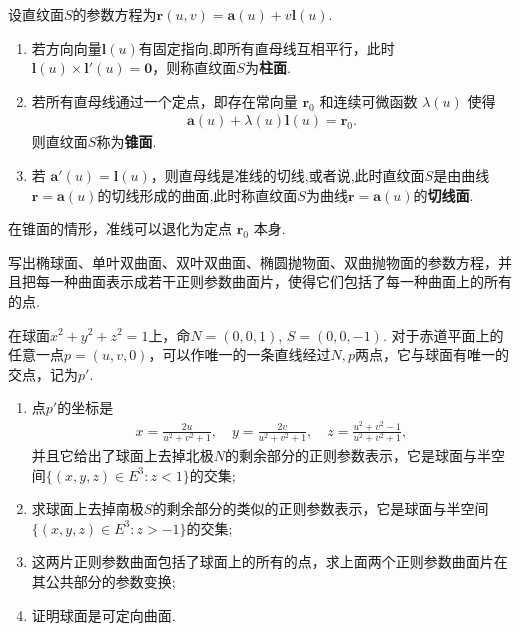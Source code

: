 \documentclass[../../main.tex]{subfiles}%
\begin{document}
\begin{definition}
设直纹面$S$的参数方程为$\bm{r}(u,v)=\bm{a}(u)+v\bm{l}(u)$.
\begin{enumerate}[(1)]
\item 若方向向量$\bm{l}(u)$有固定指向,即所有直母线互相平行，此时$\bm{l}(u)\times\bm{l}'(u)=\bm{0}$，则称直纹面$S$为\textbf{柱面}.

\item 若所有直母线通过一个定点，即存在常向量 $\bm{r}_0$ 和连续可微函数 $\lambda(u)$ 使得
\begin{align*}
\bm{a}(u)+\lambda(u)\bm{l}(u)=\bm{r}_0.
\end{align*}
则直纹面$S$称为\textbf{锥面}.

\item 若 $\bm{a}'(u)=\bm{l}(u)$，则直母线是准线的切线,或者说,此时直纹面$S$是由曲线$\bm{r}=\bm{a}(u)$的切线形成的曲面,此时称直纹面$S$为曲线$\bm{r}=\bm{a}(u)$的\textbf{切线面}.
\end{enumerate}
\end{definition}
\begin{remark}
在锥面的情形，准线可以退化为定点 $\bm{r}_0$ 本身.
\end{remark}

\begin{example}
写出椭球面、单叶双曲面、双叶双曲面、椭圆抛物面、双曲抛物面的参数方程，并且把每一种曲面表示成若干正则参数曲面片，使得它们包括了每一种曲面上的所有的点.
\end{example}
\begin{solution}


\end{solution}

\begin{example}
在球面$x^2 + y^2 + z^2 = 1$上，命$N = (0,0,1)$, $S = (0,0,-1)$. 对于赤道平面上的任意一点$p = (u,v,0)$，可以作唯一的一条直线经过$N, p$两点，它与球面有唯一的交点，记为$p'$.
\begin{enumerate}[(1)]
\item 点$p'$的坐标是
\begin{align*}
x = \frac{2u}{u^2 + v^2 + 1}, \quad y = \frac{2v}{u^2 + v^2 + 1}, \quad z = \frac{u^2 + v^2 - 1}{u^2 + v^2 + 1},
\end{align*}
并且它给出了球面上去掉北极$N$的剩余部分的正则参数表示，它是球面与半空间$\{(x,y,z) \in E^3: z < 1\}$的交集;
\item 求球面上去掉南极$S$的剩余部分的类似的正则参数表示，它是球面与半空间$\{(x,y,z) \in E^3: z > -1\}$的交集;
\item 这两片正则参数曲面包括了球面上的所有的点，求上面两个正则参数曲面片在其公共部分的参数变换;
\item 证明球面是可定向曲面.
\end{enumerate}
\end{example}
\begin{solution}


\end{solution}
\end{document}
